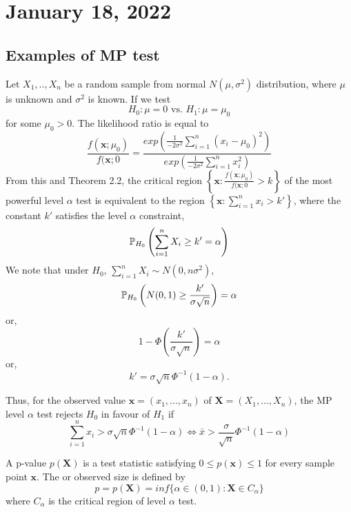\section{January 18, 2022}
\subsection{Examples of MP test}
\begin{example}
Let $X_1,..,X_n$ be a random sample from normal $N(\mu, \sigma^2)$ distribution, where $\mu$ is unknown and $\sigma^2$ is known. If we test
$$
H_0: \mu = 0  \text{ vs. } H_1:\mu = \mu_0
$$ for some $\mu_0>0$. The likelihood ratio is equal to 
$$
\frac{f(\boldsymbol{x};\mu_0)}{f(\boldsymbol{x};0} = \frac{exp(\frac{1}{-2 \sigma^2}\sum_{i=1}^{n}(x_i - \mu_0)^2)}{exp(\frac{1}{-2\sigma^2}\sum_{i=1}^{n}x_i^{2})}
$$
From this and Theorem 2.2, the critical region 
$ \left\{ 
\boldsymbol{x}: \frac{f(\boldsymbol{x};\mu_0)}{f(\boldsymbol{x};0} > k
\right \}$ of the most powerful level $\alpha$ test is equivalent to the region 
$ \left\{ 
\boldsymbol{x}: \sum_{i=1}^{n}x_i > k'
\right \}$,
where the constant $k'$ satisfies the level $\alpha$ constraint,
$$
\mathbb P_{H_0} \left( 
\sum_{i=1}^{n}X_i \geq k' = \alpha
\right)
$$
We note that under $H_0$, $\sum_{i=1}^{n}X_i \sim N(0,n\sigma^2)$,
$$
\mathbb P_{H_0} \left(
N(0,1) \geq \frac{k'}{\sigma \sqrt{n}}
\right) = \alpha
$$
or,
$$
1 - \Phi \left( \frac{k'}{\sigma \sqrt{n}} \right ) = \alpha
$$
or,
$$
k' = \sigma \sqrt{n}\Phi^{-1}(1-\alpha).$$ 

Thus, for the observed value
$\boldsymbol{x} = (x_1,...,x_n)$ of $\boldsymbol{X} = (X_1,...,X_n)$, the MP level $\alpha$ test rejects $H_0$ in favour of $H_1$ if 
$$
\sum_{i=1}^{n}x_i > \sigma \sqrt{n} \Phi^{-1}(1- \alpha) \iff  \bar{x} > \frac \sigma{\sqrt{n}}\Phi^{-1}(1-\alpha)
$$

\end{example}

\begin{definition}[p-value]
A p-value $p(\boldsymbol{X})$ is a test statistic satisfying $0 \leq p(\boldsymbol{x}) \leq 1$ for every sample point $\boldsymbol{x}$.  
The  or observed size is defined by
$$
p = p(\boldsymbol{X}) = inf \{ \alpha \in (0,1): \boldsymbol{X} \in C_{\alpha} \}
$$
where $C_{\alpha}$ is the critical region of level $\alpha$ test.
\end{definition}